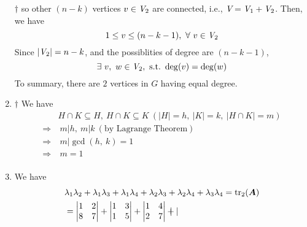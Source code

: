 \documentclass[a4paper,12pt]{article}
\begin{document}
\begin{enumerate}
\begin{answer}{$\dag$}
        so other $(n - k)$ vertices $v \in \textit{V}_2$ are connected, i.e., $\textit{V} = \textit{V}_1 + \textit{V}_2$. Then, we have \begin{equation}
            1 \le v \le (n - k - 1), \ \forall \ v \in \textit{V}_2
        \end{equation} Since $|\textit{V}_2| = n - k$, and the possiblities of degree are $(n - k - 1)$, \begin{equation}
            \exists \ v, \ w \in \V_2, \ \text{s.t.} \ \deg(v) = \deg(w)
        \end{equation} To summary, there are $2$ vertices in $G$ having equal degree.
    \end{answer}
    \item \begin{answer}{$\dag$} We have \begin{equation}
            \begin{aligned}
                & H \cap K \subseteq H, \ H \cap K \subseteq K \ (|H| = h, \ |K| = k, \ |H \cap K| = m) \\
                \Rightarrow & \ m | h, \ m | k \ (\text{by Lagrange Theorem}) \\
                \Rightarrow & \ m | \gcd(h, \ k) = 1 \\
                \Rightarrow & \ m = 1 \\
            \end{aligned}
        \end{equation} 
    \end{answer}
    \item We have \begin{equation}
        \begin{aligned}
            & \lambda_1\lambda_2 + \lambda_1\lambda_3 + \lambda_1\lambda_4 + \lambda_2\lambda_3 + \lambda_2\lambda_4 + \lambda_3\lambda_4 = \operatorname{tr}_2(\boldsymbol{A}) \\
            & = \begin{vmatrix}
                1 & 2 \\
                8 & 7
            \end{vmatrix} + \begin{vmatrix}
                1 & 3 \\
                1 & 5
            \end{vmatrix} + \begin{vmatrix}
                1 & 4 \\
                2 & 7
            \end{vmatrix} + \begin{vmatrix}

\end{vmatrix}
\end{aligned}
\end{equation}
\end{enumerate}
\end{document}
